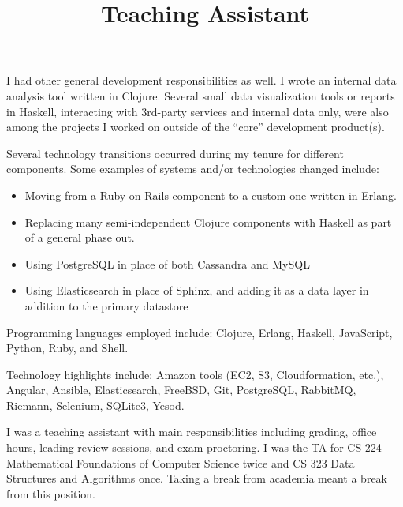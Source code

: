 \documentclass[margintitle,line]{res}
\begin{document}
\begin{resume}
\begin{position}
  I had other general development responsibilities as well. I wrote an
  internal data analysis tool written in Clojure. Several small data visualization
  tools or reports in Haskell, interacting with 3rd-party services and internal
  data only, were also among the projects I worked on outside of the ``core''
  development product(s).


  Several technology transitions occurred during my tenure for different components.
  Some examples of systems and/or technologies changed include:
  \begin{itemize}
    \item{Moving from a Ruby on Rails component to a custom one written in Erlang.}
    \item{Replacing many semi-independent Clojure components with Haskell
      as part of a general phase out.}
    \item{Using PostgreSQL in place of both Cassandra and MySQL}
    \item{Using Elasticsearch in place of Sphinx, and adding it as a data layer
      in addition to the primary datastore}
  \end{itemize}

  Programming languages employed include:
  Clojure, Erlang, Haskell, JavaScript, Python, Ruby, and Shell.

  Technology highlights include: Amazon tools (EC2, S3, Cloudformation, etc.),
  Angular, Ansible, Elasticsearch, FreeBSD, Git, PostgreSQL, RabbitMQ, Riemann,
  Selenium, SQLite3, Yesod.
\end{position}

\title{Teaching Assistant}
\begin{position}
 I was a teaching assistant with main responsibilities including
 grading, office hours, leading review sessions, and exam
 proctoring. I was the TA for CS 224 Mathematical Foundations of
 Computer Science twice and CS 323 Data Structures and Algorithms
 once. Taking a break from academia meant a break from this position.
\end{position}


\end{resume}
\end{document}

